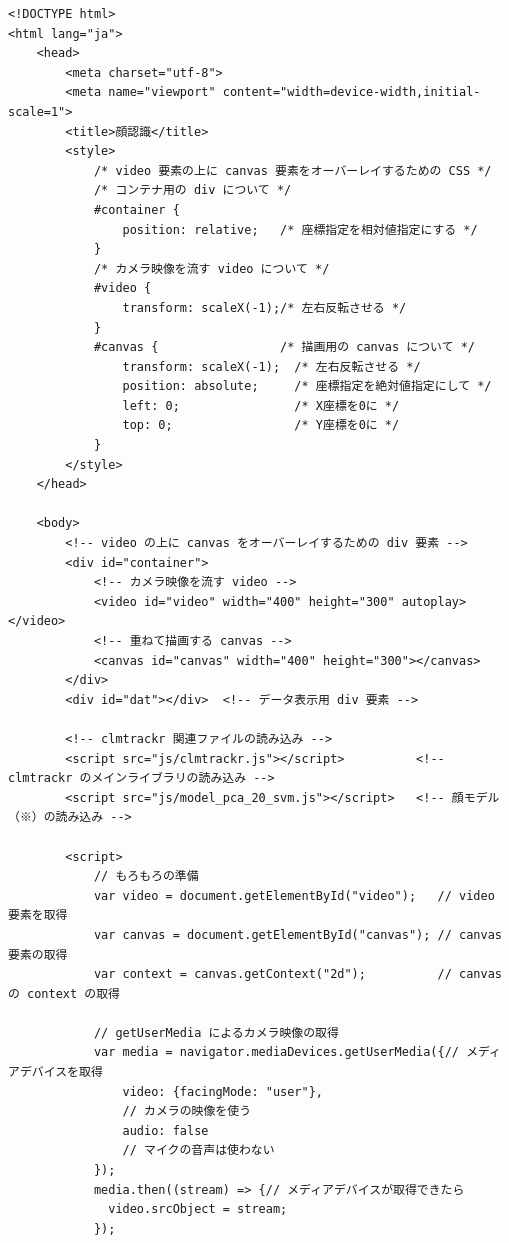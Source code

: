\documentclass[mingoth,11pt,a4j,uplatex]{jsarticle}
\begin{document}
\begin{lstlisting}[caption=07-03.html]
<!DOCTYPE html>
<html lang="ja">
    <head>
        <meta charset="utf-8">
        <meta name="viewport" content="width=device-width,initial-scale=1">
        <title>顔認識</title>
        <style>
            /* video 要素の上に canvas 要素をオーバーレイするための CSS */
            /* コンテナ用の div について */
            #container {              
                position: relative;   /* 座標指定を相対値指定にする */
            }
            /* カメラ映像を流す video について */
            #video {                  
                transform: scaleX(-1);/* 左右反転させる */
            }
            #canvas {                 /* 描画用の canvas について */
                transform: scaleX(-1);  /* 左右反転させる */
                position: absolute;     /* 座標指定を絶対値指定にして */
                left: 0;                /* X座標を0に */
                top: 0;                 /* Y座標を0に */
            }
        </style>
    </head>

    <body>
        <!-- video の上に canvas をオーバーレイするための div 要素 -->
        <div id="container">  
            <!-- カメラ映像を流す video -->
            <video id="video" width="400" height="300" autoplay></video>
            <!-- 重ねて描画する canvas -->
            <canvas id="canvas" width="400" height="300"></canvas>        
        </div>
        <div id="dat"></div>  <!-- データ表示用 div 要素 -->
        
        <!-- clmtrackr 関連ファイルの読み込み -->
        <script src="js/clmtrackr.js"></script>          <!-- clmtrackr のメインライブラリの読み込み -->
        <script src="js/model_pca_20_svm.js"></script>   <!-- 顔モデル（※）の読み込み -->
        
        <script>
            // もろもろの準備
            var video = document.getElementById("video");   // video 要素を取得
            var canvas = document.getElementById("canvas"); // canvas 要素の取得
            var context = canvas.getContext("2d");          // canvas の context の取得
            
            // getUserMedia によるカメラ映像の取得
            var media = navigator.mediaDevices.getUserMedia({// メディアデバイスを取得
                video: {facingMode: "user"},                          
                // カメラの映像を使う
                audio: false                                          
                // マイクの音声は使わない
            });
            media.then((stream) => {// メディアデバイスが取得できたら
              video.srcObject = stream;
            });
            

\end{lstlisting}
\end{document}
